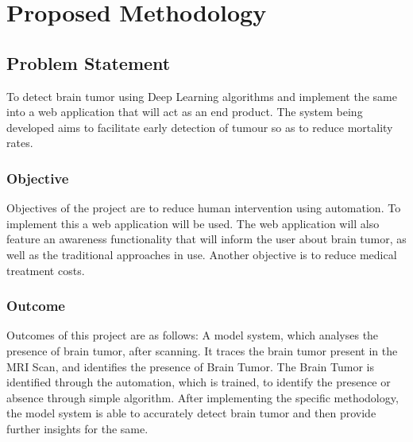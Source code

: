\chapter{Proposed Methodology}
\section{Problem Statement}
To detect brain tumor using Deep Learning algorithms and implement the same into a web application that will act as an end product. The system being developed aims to facilitate early detection of tumour so as to reduce mortality rates. 
\subsection{Objective}
Objectives of the project are to reduce human intervention using automation. To implement this a web application will be used. The web application will also feature an awareness functionality that will inform the user about brain tumor, as well as the traditional approaches in use. Another objective is to reduce medical treatment costs.

\subsection{Outcome}
Outcomes of this project are as follows:
A model system, which analyses the presence of brain tumor, after scanning. It traces the brain tumor present in the MRI Scan, and identifies the presence of Brain Tumor. The Brain Tumor is identified through the automation, which is trained, to identify the presence or absence through simple algorithm. After implementing the specific methodology, the model system is able to accurately detect brain tumor and then provide further insights for the same.

